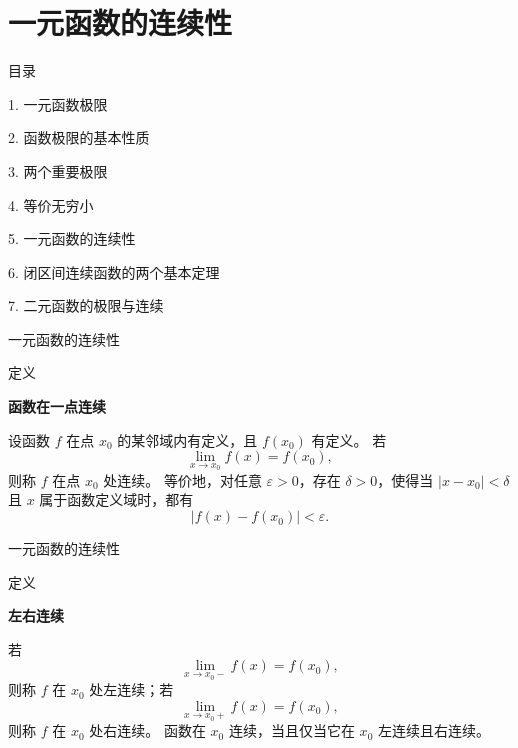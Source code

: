 \documentclass[aspectratio=169,10pt,fontset=fandol]{ctexbeamer}
\begin{document}
\section{一元函数的连续性}
\begin{frame}[t,fragile]{目录}
\normalsize
{\color{black}\normalsize 1. 一元函数极限\par}\vspace{0.22em}
{\color{black}\normalsize 2. 函数极限的基本性质\par}\vspace{0.22em}
{\color{black}\normalsize 3. 两个重要极限\par}\vspace{0.22em}
{\color{black}\normalsize 4. 等价无穷小\par}\vspace{0.22em}
{\color{blue}\normalsize 5. 一元函数的连续性\par}\vspace{0.22em}
{\color{gray!40}\normalsize 6. 闭区间连续函数的两个基本定理\par}\vspace{0.22em}
{\color{gray!40}\normalsize 7. 二元函数的极限与连续\par}\vspace{0.22em}
\end{frame}
\begin{frame}[t,fragile]{一元函数的连续性}
\normalsize
\begin{block}{定义}
{\normalsize
\textbf{函数在一点连续}\par

设函数 $f$ 在点 $x_0$ 的某邻域内有定义，且 $f(x_0)$ 有定义。 若
\[
\lim_{x\to x_0}f(x)=f(x_0),
\]
则称 $f$ 在点 $x_0$ 处连续。 等价地，对任意 $\varepsilon>0$，存在 $\delta>0$，使得当 $|x-x_0|<\delta$ 且 $x$ 属于函数定义域时，都有
\[
|f(x)-f(x_0)|<\varepsilon.
\]

}
\end{block}
\end{frame}
\begin{frame}[t,fragile]{一元函数的连续性}
\normalsize
\begin{block}{定义}
{\normalsize
\textbf{左右连续}\par

若
\[
\lim_{x\to x_0-}f(x)=f(x_0),
\]
则称 $f$ 在 $x_0$ 处左连续；若
\[
\lim_{x\to x_0+}f(x)=f(x_0),
\]
则称 $f$ 在 $x_0$ 处右连续。 函数在 $x_0$ 连续，当且仅当它在 $x_0$ 左连续且右连续。

}
\end{block}
\end{frame}
\end{document}
